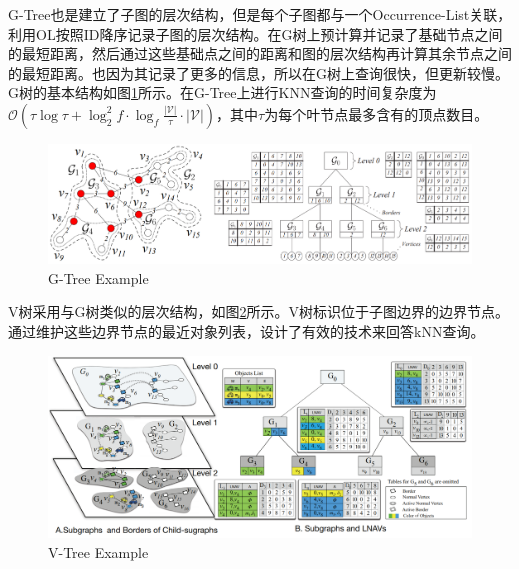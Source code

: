 \documentclass{ML}
\begin{document}
G-Tree\cite{G-tree}也是建立了子图的层次结构，但是每个子图都与一个Occurrence-List关联，利用OL按照ID降序记录子图的层次结构。在G树上预计算并记录了基础节点之间的最短距离，然后通过这些基础点之间的距离和图的层次结构再计算其余节点之间的最短距离。也因为其记录了更多的信息，所以在G树上查询很快，但更新较慢。G树的基本结构如图\ref{fig:G-tree}所示。在G-Tree上进行KNN查询的时间复杂度为$\mathcal{O}\left(\tau \log \tau+\log _{2}^{2} f \cdot \log _{f} \frac{|\mathcal{V}|}{\tau} \cdot|\mathcal{V}|\right)$，其中$\tau$为每个叶节点最多含有的顶点数目。

\begin{figure}[htb]
	\centering
	\includegraphics[width=0.9\linewidth]{media/g-tree.png}
	\caption{G-Tree Example}\label{fig:G-tree}
\end{figure}

V树\cite{V-tree}采用与G树类似的层次结构，如图\ref{fig:V-tree}所示。V树标识位于子图边界的边界节点。通过维护这些边界节点的最近对象列表，设计了有效的技术来回答kNN查询。

\begin{figure}[htb]
	\centering
	\includegraphics[width=0.9\linewidth]{media/v-tree.png}
	\caption{V-Tree Example}\label{fig:V-tree}
\end{figure}

\appendix
\end{document}

